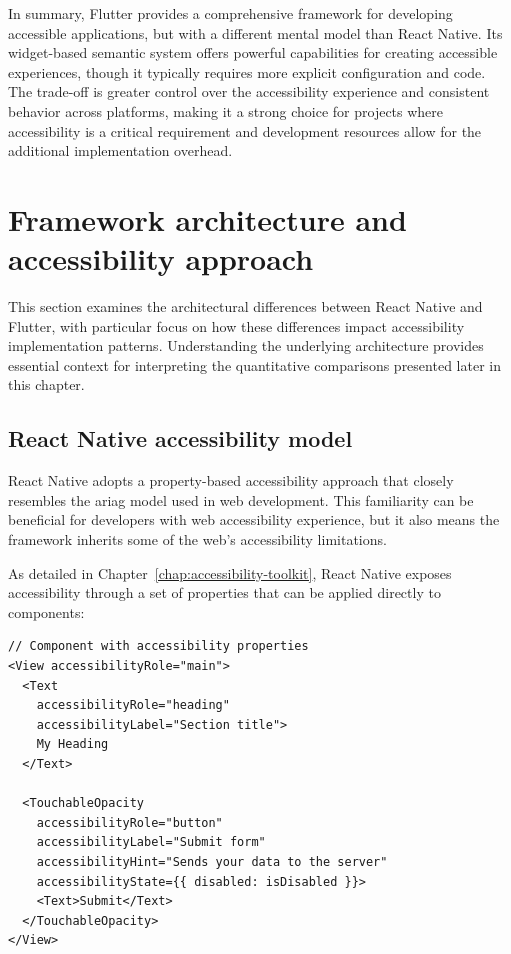 In summary, Flutter provides a comprehensive framework for developing accessible applications, but with a different mental model than React Native. Its widget-based semantic system offers powerful capabilities for creating accessible experiences, though it typically requires more explicit configuration and code. The trade-off is greater control over the accessibility experience and consistent behavior across platforms, making it a strong choice for projects where accessibility is a critical requirement and development resources allow for the additional implementation overhead.

\section{Framework architecture and accessibility approach}

This section examines the architectural differences between React Native and Flutter, with particular focus on how these differences impact accessibility implementation patterns. Understanding the underlying architecture provides essential context for interpreting the quantitative comparisons presented later in this chapter.

\subsection{React Native accessibility model}
React Native adopts a property-based accessibility approach that closely resembles the \gls{ariag} model used in web development. This familiarity can be beneficial for developers with web accessibility experience, but it also means the framework inherits some of the web's accessibility limitations.

As detailed in Chapter~\ref{chap:accessibility-toolkit}, React Native exposes accessibility through a set of properties that can be applied directly to components:

\begin{lstlisting}[style=ReactNativeStyle, caption=React Native accessibility property model, label=lst:react-native-accessibility]
// Component with accessibility properties
<View accessibilityRole="main">
  <Text 
    accessibilityRole="heading" 
    accessibilityLabel="Section title">
    My Heading
  </Text>
  
  <TouchableOpacity
    accessibilityRole="button"
    accessibilityLabel="Submit form"
    accessibilityHint="Sends your data to the server"
    accessibilityState={{ disabled: isDisabled }}>
    <Text>Submit</Text>
  </TouchableOpacity>
</View>
\end{lstlisting}

